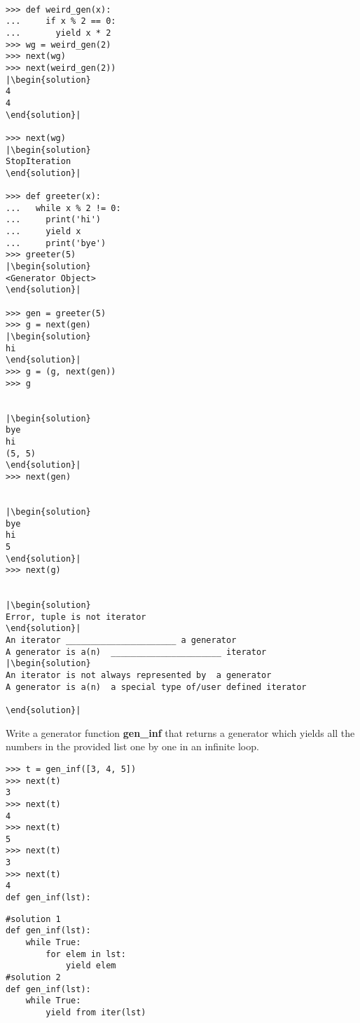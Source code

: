 \begin{lstlisting}

>>> def weird_gen(x):
... 	if x % 2 == 0:
... 	  yield x * 2
>>> wg = weird_gen(2)
>>> next(wg)
>>> next(weird_gen(2))
|\begin{solution}
4
4
\end{solution}|

>>> next(wg)
|\begin{solution}
StopIteration
\end{solution}|

>>> def greeter(x):
...   while x % 2 != 0:
...     print('hi')
...     yield x
...     print('bye')
>>> greeter(5)
|\begin{solution}
<Generator Object>
\end{solution}|

>>> gen = greeter(5)
>>> g = next(gen)
|\begin{solution}
hi
\end{solution}|
>>> g = (g, next(gen))
>>> g


|\begin{solution}
bye
hi
(5, 5)
\end{solution}|
>>> next(gen)


|\begin{solution}
bye
hi
5
\end{solution}|
>>> next(g)


|\begin{solution}
Error, tuple is not iterator
\end{solution}|
An iterator ______________________ a generator
A generator is a(n)  ______________________ iterator
|\begin{solution}
An iterator is not always represented by  a generator
A generator is a(n)  a special type of/user defined iterator

\end{solution}|
\end{lstlisting}
\newpage


\question
Write a generator function \textbf{gen\_inf} that returns a generator which yields all the numbers in the provided list one by one in an infinite loop. 

\begin{lstlisting}
>>> t = gen_inf([3, 4, 5])
>>> next(t)
3
>>> next(t)
4
>>> next(t)
5
>>> next(t)
3
>>> next(t)
4
def gen_inf(lst):
\end{lstlisting}

\begin{solution}[1in]
\begin{verbatim}
#solution 1
def gen_inf(lst):
    while True:
        for elem in lst:
            yield elem
#solution 2
def gen_inf(lst):
    while True:
        yield from iter(lst)
\end{verbatim}
\end{solution}
\newpage


